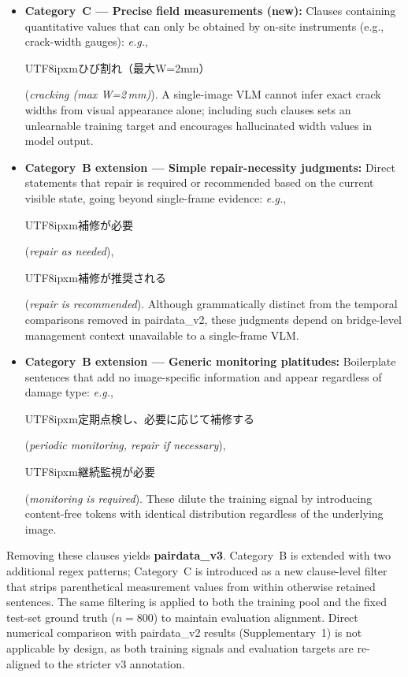 \documentclass[onecolumn]{article}
\begin{document}
\begin{itemize}
  \item \textbf{Category~C --- Precise field measurements (new):}
        Clauses containing quantitative values that can only be obtained
        by on-site instruments (e.g., crack-width gauges):
        \textit{e.g.},
        \begin{CJK}{UTF8}{ipxm}ひび割れ（最大W=2mm）\end{CJK}
        (\textit{cracking (max W=2\,mm)}).
        A single-image VLM cannot infer exact crack widths from visual
        appearance alone; including such clauses sets an unlearnable
        training target and encourages hallucinated width values in
        model output.

  \item \textbf{Category~B extension --- Simple repair-necessity judgments:}
        Direct statements that repair is required or recommended based on
        the current visible state, going beyond single-frame evidence:
        \textit{e.g.},
        \begin{CJK}{UTF8}{ipxm}補修が必要\end{CJK}
        (\textit{repair as needed}),
        \begin{CJK}{UTF8}{ipxm}補修が推奨される\end{CJK}
        (\textit{repair is recommended}).
        Although grammatically distinct from the temporal comparisons
        removed in pairdata\_v2, these judgments depend on bridge-level
        management context unavailable to a single-frame VLM.

  \item \textbf{Category~B extension --- Generic monitoring platitudes:}
        Boilerplate sentences that add no image-specific information
        and appear regardless of damage type:
        \textit{e.g.},
        \begin{CJK}{UTF8}{ipxm}定期点検し、必要に応じて補修する\end{CJK}
        (\textit{periodic monitoring, repair if necessary}),
        \begin{CJK}{UTF8}{ipxm}継続監視が必要\end{CJK}
        (\textit{monitoring is required}).
        These dilute the training signal by introducing
        content-free tokens with identical distribution regardless of
        the underlying image.
\end{itemize}

\noindent
Removing these clauses yields \textbf{pairdata\_v3}.
Category~B is extended with two additional regex patterns;
Category~C is introduced as a new clause-level filter that strips
parenthetical measurement values from within otherwise retained sentences.
The same filtering is applied to both the training pool and the
fixed test-set ground truth ($n=800$) to maintain evaluation alignment.
Direct numerical comparison with pairdata\_v2 results
(Supplementary~1) is not applicable by design, as both training
signals and evaluation targets are re-aligned to the stricter v3 annotation.
\end{document}
